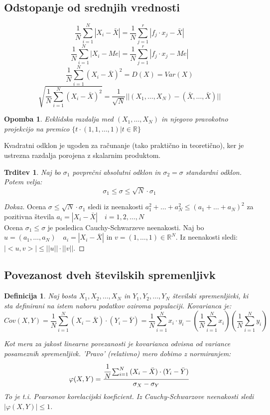 \documentclass[11pt]{article}
\newtheorem{Trditev}[Izrek]{{\sc Trditev}}
\newtheorem{Definicija}[Izrek]{{\sc Definicija}}
\newtheorem{Opomba}[Izrek]{{\sc Opomba}}
\newenvironment{dokaz}[1][{\sc Dokaz}]{\begin{proof}[#1]\renewcommand*{\qedsymbol}{\(\blacksquare\)}}{\end{proof}}
\begin{document}
\subsection{Odstopanje od srednjih vrednosti}
	$$\frac{1}{N}\sum_{i = 1}^{N}{|X_i - \bar{X}|} = \frac{1}{N}\sum_{j = 1}^{r}{|f_j \cdot x_j - \bar{X}|}$$
	$$\frac{1}{N}\sum_{i = 1}^{N}{|X_i - Me|} = \frac{1}{N}\sum_{j = 1}^{r}{|f_j \cdot x_j - Me|}$$
	$$\frac{1}{N}\sum_{i = 1}^{N}{(X_i - \bar{X})^2} = D(X) = Var(X)$$
	$$\sqrt{\frac{1}{N}\sum_{i = 1}^{N}{(X_i - \bar{X})^2}} = \frac{1}{\sqrt{N}}||(X_1, \ldots ,X_N) - (\bar{X},\ldots ,\bar{X}) || $$
\begin{Opomba}
	Evklidska razdalja med $(X_1, \ldots , X_N) $  in njegovo pravokotno projekcijo na premico $\{ t \cdot (1,1, \ldots, 1) | t\in \mathbb{R} \}$
\end{Opomba}	

Kvadratni odklon je ugoden za računanje (tako praktično in teoretično), ker je ustrezna razdalja porojena z skalarnim produktom.
\begin{Trditev}
	Naj bo $\sigma_1$ povprečni absolutni odklon in $\sigma_2 = \sigma$ standardni odklon. Potem velja:
	$$\sigma_1 \le \sigma \le  \sqrt{N} \cdot \sigma_1$$
\end{Trditev}
\begin{dokaz}
	Ocena $\sigma \le  \sqrt{N} \cdot \sigma_1$ sledi iz neenakosti $a_1^2 +\ldots + a_N^2 \le (a_1 + \ldots + a_N)^2$ za pozitivna števila $a_i = |X_i - \bar{X}| \quad i= 1,2,\ldots,N$
	\\
	Ocena $\sigma_1 \le \sigma$ je posledica Cauchy-Schwarzeve neenakosti. Naj bo $u = (a_1, \ldots, a_N) \quad   a_i = |X_i - \bar{X}|$ in $v= (1,\ldots, 1) \in \mathbb{R}^N$. Iz neenakosti sledi: $|<u,v>| \le||u|| \cdot ||v||$.
\end{dokaz}

\subsection{Povezanost dveh  številskih spremenljivk}
\begin{Definicija}
	Naj bosta $X_1, X_2, \ldots, X_N$ in $Y_1,Y_2,\ldots, Y_N$ številski spremenljivki, ki sta definirani na istem naboru podatkov oziroma populaciji. Kovarianca je:
	$$Cov(X,Y) = \frac{1}{N}\sum_{i = 1}^{N}{(X_i - \bar{X})\cdot (Y_i - \bar{Y})} = \frac{1}{N}\sum_{i = 1}^{N}{x_i \cdot y_i} - \left(\frac{1}{N}  \sum_{i = 1}^{N}{x_i}\right)\left( \frac{1}{N}\sum_{i = 1}^{N}{y_i}\right)$$
	
	Kot mera za jakost linearne povezanosti je kovarianca odvisna od variance posameznih spremenljivk. 'Pravo' (relativno) mero dobimo z normiranjem:
	$$\varphi(X,Y) = \frac{\cfrac{1}{N}\sum_{i = 1}^{N}{(X_i - \bar{X})\cdot (Y_i - \bar{Y})} }{\sigma_X - \sigma_Y}$$
	To je t.i. Pearsonov korelacijski koeficient. Iz Cauchy-Schwarzove neenakosti sledi $|\varphi(X,Y)| \le 1$.
\end{Definicija}
\end{document}
